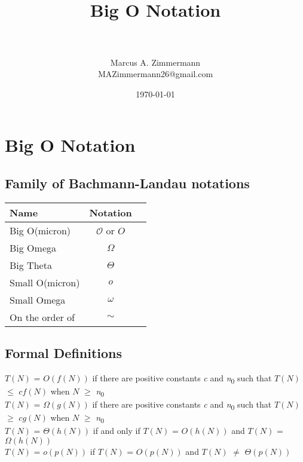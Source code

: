 \documentclass[letterpaper, 10pt,DIV=13]{scrartcl}
\title{	
   \normalfont \normalsize
   \horrule{0.5pt} \\[0.25cm] 	%
   \huge Big O Notation  \\     	    %
   \horrule{0.5pt} \\[0.25cm] 	%
}
\author{Marcus A. Zimmermann \\ \normalsize MAZimmermann26@gmail.com}
\date{\normalsize\today} 	%
\numberwithin{equation}{section} %
\numberwithin{figure}{section} %
\numberwithin{table}{section} %
\begin{document}
\maketitle %

\section*{Big O Notation}

\newcommand{\bslash}{\char`\\}
 
\subsection*{Family of Bachmann-Landau notations}
\setlength{\tabcolsep}{12pt}
\renewcommand*{\arraystretch}{1.2}
\begin{tabular}{lcl}
\hline
Name&Notation\\
\hline
{Big O(micron)}&$\mathcal{O}$ or $O$\\
{Big Omega}&$\Omega$\\
{Big Theta}&$\Theta$\\
{Small O(micron)}&$o$\\
{Small Omega}&$\omega$\\
{On the order of}&$\sim$\\
\hline
\end{tabular}

\subsection*{Formal Definitions}

$T(N)$ =  $O(f(N))$ if there are positive constants \textit{c} and \textit{n}\textsubscript{0} such 
that $T(N)$ $\leq$ $cf(N)$ when $N$ $\geq$ \textit{n}\textsubscript{0} \\

$T(N)$ =  $\Omega(g(N))$ if there are positive constants \textit{c} and \textit{n}\textsubscript{0} such 
that $T(N)$ $\geq$ $cg(N)$ when $N$ $\geq$ \textit{n}\textsubscript{0} \\

$T(N)$ =  $\Theta(h(N))$ if and only if $T(N)$ =  $O(h(N))$ and $T(N)$ =  $\Omega(h(N))$ \\

$T(N)$ =  $o(p(N))$ if $T(N)$ =  $O(p(N))$ and $T(N)$  $\neq$  $\Theta(p(N))$

\end{document}
